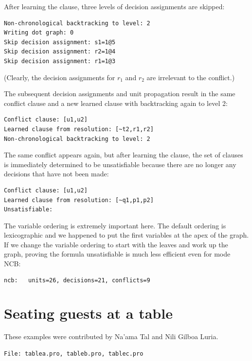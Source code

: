 \documentclass[11pt]{report}
\newcommand*{\p}[1]{\textup{\texttt{#1}}}
\newcommand*{\fl}[1]{\parbox{\textwidth}{\raggedleft \p{File: #1}}}
\begin{document}
After learning the clause, three levels of decision assignments are
skipped:
\begin{verbatim}
Non-chronological backtracking to level: 2
Writing dot graph: 0
Skip decision assignment: s1=1@5
Skip decision assignment: r2=1@4
Skip decision assignment: r1=1@3
\end{verbatim}
(Clearly, the decision assignments for $r_1$ and $r_2$ are irrelevant to
the conflict.)

The subsequent decision assignments and unit propagation result in the
same conflict clause and a new learned clause with backtracking again to
level 2:

\begin{verbatim}
Conflict clause: [u1,u2]
Learned clause from resolution: [~t2,r1,r2]
Non-chronological backtracking to level: 2
\end{verbatim}

The same conflict appears again, but after learning the clause, the set
of clauses is immediately determined to be unsatisfiable because there
are no longer any decisions that have not been made:

\begin{verbatim}
Conflict clause: [u1,u2]
Learned clause from resolution: [~q1,p1,p2]
Unsatisfiable:
\end{verbatim}

The variable ordering is extremely important here. The default ordering
is lexicographic and we happened to put the first variables at the apex
of the graph. If we change the variable ordering to start with the
leaves and work up the graph, proving the formula unsatisfiable is much
less efficient even for mode NCB:

\begin{verbatim}
ncb:   units=26, decisions=21, conflicts=9
\end{verbatim}


\section{Seating guests at a table}

\begin{center}
These examples were contributed by Na'ama Tal and Nili Gilboa Luria.
\end{center}

\fl{tablea.pro, tableb.pro, tablec.pro}
\end{document}
